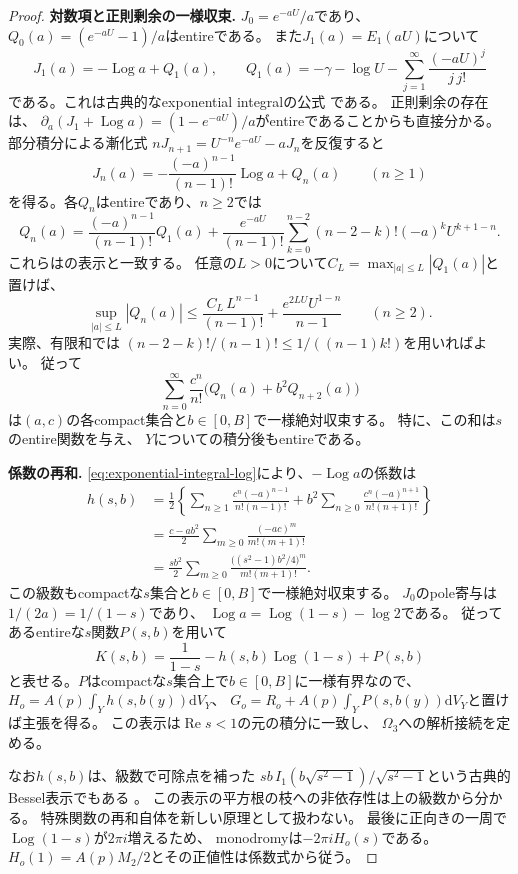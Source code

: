 \documentclass[11pt,a4paper]{ltjsarticle}
\newcommand{\dd}{\mathrm d}
\theoremstyle{plain}
\theoremstyle{definition}
\theoremstyle{remark}
\begin{document}
\begin{proof}
\par\smallskip\noindent\textbf{対数項と正則剰余の一様収束.}\quad
$J_0=e^{-aU}/a$であり、$Q_0(a)=(e^{-aU}-1)/a$はentireである。
また$J_1(a)=E_1(aU)$について
\[
 J_1(a)=-\operatorname{Log}a+Q_1(a),\qquad
 Q_1(a)=-\gamma-\log U-\sum_{j=1}^{\infty}\frac{(-aU)^j}{j\,j!}
\]
である。これは古典的なexponential integralの公式
\cite[(6.6.2)]{NISTDLMF}である。
正則剰余の存在は、
$\partial_a(J_1+\operatorname{Log}a)=(1-e^{-aU})/a$がentireであることからも直接分かる。
部分積分による漸化式
$nJ_{n+1}=U^{-n}e^{-aU}-aJ_n$を反復すると
\begin{equation}
\label{eq:exponential-integral-log}
 J_n(a)=-\frac{(-a)^{n-1}}{(n-1)!}\operatorname{Log}a+Q_n(a)
 \qquad(n\ge1)
\end{equation}
を得る。各$Q_n$はentireであり、$n\ge2$では
\[
 Q_n(a)=\frac{(-a)^{n-1}}{(n-1)!}Q_1(a)
 +\frac{e^{-aU}}{(n-1)!}
    \sum_{k=0}^{n-2}(n-2-k)!(-a)^kU^{k+1-n}.
\]
これらは\cite[(8.19.7)--(8.19.8), (8.19.12)]{NISTDLMF}の表示と一致する。
任意の$L>0$について$C_L=\max_{|a|\le L}|Q_1(a)|$と置けば、
\begin{equation}
\label{eq:product-kernel-holomorphic-bound}
 \sup_{|a|\le L}|Q_n(a)|
 \le \frac{C_L\,L^{n-1}}{(n-1)!}
       +\frac{e^{2LU}U^{1-n}}{n-1}
 \qquad(n\ge2).
\end{equation}
実際、有限和では
$(n-2-k)!/(n-1)!\le1/((n-1)k!)$を用いればよい。
従って
\[
 \sum_{n=0}^{\infty}\frac{c^n}{n!}
             \bigl(Q_n(a)+b^2Q_{n+2}(a)\bigr)
\]
は$(a,c)$の各compact集合と$b\in[0,B]$で一様絶対収束する。
特に、この和は$s$のentire関数を与え、
$Y$についての積分後もentireである。

\par\smallskip\noindent\textbf{係数の再和.}\quad
\eqref{eq:exponential-integral-log}により、$-\operatorname{Log}a$の係数は
\begin{align*}
 h(s,b)
 &=\frac12\left\{
   \sum_{n\ge1}\frac{c^n(-a)^{n-1}}{n!(n-1)!}
   +b^2\sum_{n\ge0}\frac{c^n(-a)^{n+1}}{n!(n+1)!}
              \right\}\\
 &=\frac{c-ab^2}{2}
       \sum_{m\ge0}\frac{(-ac)^m}{m!(m+1)!}\\
 &=\frac{sb^2}{2}
       \sum_{m\ge0}\frac{\bigl((s^2-1)b^2/4\bigr)^m}{m!(m+1)!}.
\end{align*}
この級数もcompactな$s$集合と$b\in[0,B]$で一様絶対収束する。
$J_0$のpole寄与は$1/(2a)=1/(1-s)$であり、
$\operatorname{Log}a=\operatorname{Log}(1-s)-\log2$である。
従ってあるentireな$s$関数$P(s,b)$を用いて
\[
 K(s,b)=\frac1{1-s}-h(s,b)\operatorname{Log}(1-s)+P(s,b)
\]
と表せる。$P$はcompactな$s$集合上で$b\in[0,B]$に一様有界なので、
$H_o=A(p)\int_Yh(s,b(y))\dd V_Y$、
$G_o=R_o+A(p)\int_YP(s,b(y))\dd V_Y$と置けば主張を得る。
この表示は$\operatorname{Re}s<1$の元の積分に一致し、
$\Omega_3$への解析接続を定める。

なお$h(s,b)$は、級数で可除点を補った
$sb\,I_1(b\sqrt{s^2-1})/\sqrt{s^2-1}$という古典的Bessel表示でもある
\cite[(10.25.2)]{NISTDLMF}。
この表示の平方根の枝への非依存性は上の級数から分かる。
特殊関数の再和自体を新しい原理として扱わない。
最後に正向きの一周で$\operatorname{Log}(1-s)$が$2\pi i$増えるため、
monodromyは$-2\pi iH_o(s)$である。
$H_o(1)=A(p)M_2/2$とその正値性は係数式から従う。
\end{proof}
\end{document}
